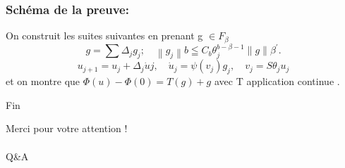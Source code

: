 \documentclass[10pt]{beamer}
\begin{document}
\begin{frame}
\frametitle{Schéma de la preuve:}
On construit les suites suivantes en prenant g $\in F_\beta$
$$
g=\sum \Delta_j g_j ; \quad\left\|g_j\right\|b \leqq C_b \theta_j^{b-\beta-1}\|g\|\beta^{\prime} .
$$
$$
u_{j+1}=u_j+\Delta_j \dot{u}j, \quad \dot{u}_j=\psi\left(v_j\right) g_j, \quad v_j=S{\theta_j} u_j
$$
et on montre que $\Phi(u) -\Phi(0) = T(g) + g$ avec T application continue . 
\end{frame}



\begin{frame}{Fin}

\begin{center}
Merci pour votre attention ! \\~\\
Q\&A
\end{center}

\end{frame}
\end{document}
